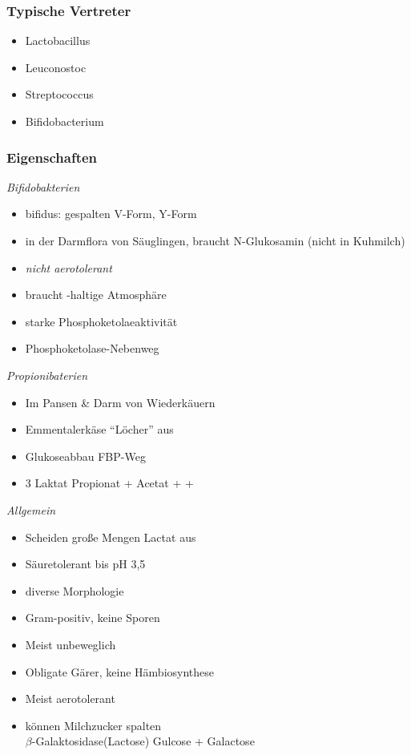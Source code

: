 \subsubsection*{Typische Vertreter}
\begin{itemize}
	\item Lactobacillus
	\item Leuconostoc
	\item Streptococcus
	\item Bifidobacterium
\end{itemize}

\subsubsection*{Eigenschaften}

\emph{Bifidobakterien}
\begin{itemize}
	\item bifidus: gespalten \textrightarrow V-Form, Y-Form
	\item in der Darmflora von Säuglingen, braucht N-Glukosamin (nicht in Kuhmilch)
	\item \textsl{nicht aerotolerant}
	\item braucht -haltige Atmosphäre
	\item starke Phosphoketolaeaktivität
	\item Phosphoketolase-Nebenweg
\end{itemize}

\emph{Propionibaterien}
\begin{itemize}
	\item Im Pansen \& Darm von Wiederkäuern
	\item Emmentalerkäse \textrightarrow ``Löcher'' aus 
	\item Glukoseabbau FBP-Weg
	\item 3 Laktat  Propionat + Acetat +  + 
\end{itemize}

\emph{Allgemein}
\begin{itemize}
	\item Scheiden große Mengen Lactat aus
	\item Säuretolerant bis pH 3,5
	\item diverse Morphologie
	\item Gram-positiv, keine Sporen
	\item Meist unbeweglich
	\item Obligate Gärer, keine Hämbiosynthese
	\item Meist aerotolerant
	\item können Milchzucker spalten\\ $\beta$-Galaktosidase(Lactose) \textrightarrow Gulcose + Galactose
\end{itemize}

